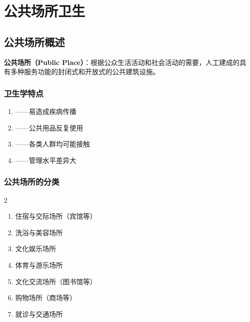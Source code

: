 \documentclass[10pt,a4paper,oneside]{ctexbook}
\begin{document}
\chapter{公共场所卫生}
\setcounter{chapter}{10}

\section{公共场所概述}

\begin{defbox}
\textbf{公共场所（Public Place）}：根据公众生活活动和社会活动的需要，人工建成的具有多种服务功能的封闭式和开放式的公共建筑设施。
\end{defbox}

\subsection{卫生学特点}

\begin{enumerate}[leftmargin=*]
    \item {}——易造成疾病传播
    \item {}——公共用品反复使用
    \item {}——各类人群均可能接触
    \item {}——管理水平差异大
\end{enumerate}

\subsection{公共场所的分类}

\begin{multicols}{2}
\begin{enumerate}[leftmargin=*]
    \item 住宿与交际场所（宾馆等）
    \item 洗浴与美容场所
    \item 文化娱乐场所
    \item 体育与游乐场所
    \item 文化交流场所（图书馆等）
    \item 购物场所（商场等）
    \item 就诊与交通场所
\end{enumerate}
\end{multicols}
\end{document}
